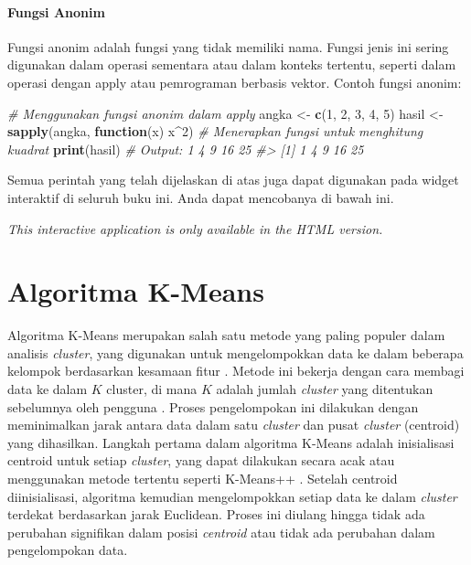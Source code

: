 \documentclass[
  oneside]{book}
\newenvironment{Shaded}{\begin{snugshade}}{\end{snugshade}}
\newcommand{\CommentTok}[1]{\textcolor[rgb]{0.56,0.35,0.01}{\textit{#1}}}
\newcommand{\ControlFlowTok}[1]{\textcolor[rgb]{0.13,0.29,0.53}{\textbf{#1}}}
\newcommand{\DecValTok}[1]{\textcolor[rgb]{0.00,0.00,0.81}{#1}}
\newcommand{\FunctionTok}[1]{\textcolor[rgb]{0.13,0.29,0.53}{\textbf{#1}}}
\newcommand{\NormalTok}[1]{#1}
\newcommand{\OtherTok}[1]{\textcolor[rgb]{0.56,0.35,0.01}{#1}}
\newcommand{\SpecialCharTok}[1]{\textcolor[rgb]{0.81,0.36,0.00}{\textbf{#1}}}
\begin{document}
\subsubsection*{Fungsi Anonim}\label{fungsi-anonim}

Fungsi anonim adalah fungsi yang tidak memiliki nama. Fungsi jenis ini sering digunakan dalam operasi sementara atau dalam konteks tertentu, seperti dalam operasi dengan apply atau pemrograman berbasis vektor. Contoh fungsi anonim:

\begin{Shaded}
\begin{Highlighting}[]
\CommentTok{\# Menggunakan fungsi anonim dalam apply}
\NormalTok{angka }\OtherTok{\textless{}{-}} \FunctionTok{c}\NormalTok{(}\DecValTok{1}\NormalTok{, }\DecValTok{2}\NormalTok{, }\DecValTok{3}\NormalTok{, }\DecValTok{4}\NormalTok{, }\DecValTok{5}\NormalTok{)}
\NormalTok{hasil }\OtherTok{\textless{}{-}} \FunctionTok{sapply}\NormalTok{(angka, }\ControlFlowTok{function}\NormalTok{(x) x}\SpecialCharTok{\^{}}\DecValTok{2}\NormalTok{)  }\CommentTok{\# Menerapkan fungsi untuk menghitung kuadrat}
\FunctionTok{print}\NormalTok{(hasil)  }\CommentTok{\# Output: 1 4 9 16 25}
\CommentTok{\#\textgreater{} [1]  1  4  9 16 25}
\end{Highlighting}
\end{Shaded}

Semua perintah yang telah dijelaskan di atas juga dapat
digunakan pada widget interaktif di seluruh buku ini. Anda dapat
mencobanya di bawah ini.

\begin{center}
\textit{This interactive application is only available in the HTML version.}
\end{center}

\chapter{Algoritma K-Means}\label{km}

Algoritma K-Means merupakan salah satu metode yang paling populer dalam analisis \emph{cluster}, yang digunakan untuk mengelompokkan data ke dalam beberapa kelompok berdasarkan kesamaan fitur \citep{jain2010} . Metode ini bekerja dengan cara membagi data ke dalam \(K\) cluster, di mana \(K\) adalah jumlah \emph{cluster} yang ditentukan sebelumnya oleh pengguna \citep{macqueen1967some}. Proses pengelompokan ini dilakukan dengan meminimalkan jarak antara data dalam satu \emph{cluster} dan pusat \emph{cluster} (centroid) yang dihasilkan. Langkah pertama dalam algoritma K-Means adalah inisialisasi centroid untuk setiap \emph{cluster}, yang dapat dilakukan secara acak atau menggunakan metode tertentu seperti K-Means++ \citep{arthur2007kmeans}. Setelah centroid diinisialisasi, algoritma kemudian mengelompokkan setiap data ke dalam \emph{cluster} terdekat berdasarkan jarak Euclidean\citep{hastie2009elements}. Proses ini diulang hingga tidak ada perubahan signifikan dalam posisi \emph{centroid} atau tidak ada perubahan dalam pengelompokan data.
\end{document}
